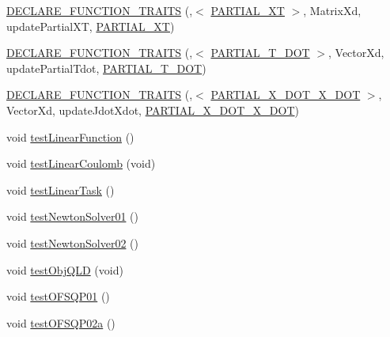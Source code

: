 \begin{DoxyCompactItemize}
\item 
\hyperlink{namespaceocra_a67f685d0a7fa29090f113f978c747179}{D\+E\+C\+L\+A\+R\+E\+\_\+\+F\+U\+N\+C\+T\+I\+O\+N\+\_\+\+T\+R\+A\+I\+TS} (,$<$ \hyperlink{namespaceocra_a40ddbec106a6034cd2047bba9945b568a66c63268a3ae1379cf55c6d7d14353de}{P\+A\+R\+T\+I\+A\+L\+\_\+\+XT} $>$, Matrix\+Xd, update\+Partial\+XT, \hyperlink{namespaceocra_a40ddbec106a6034cd2047bba9945b568a66c63268a3ae1379cf55c6d7d14353de}{P\+A\+R\+T\+I\+A\+L\+\_\+\+XT})
\item 
\hyperlink{namespaceocra_a14d77547fce68b12d71d570cc4e6740b}{D\+E\+C\+L\+A\+R\+E\+\_\+\+F\+U\+N\+C\+T\+I\+O\+N\+\_\+\+T\+R\+A\+I\+TS} (,$<$ \hyperlink{namespaceocra_a40ddbec106a6034cd2047bba9945b568a8636d1996b80fd5d53e2d2621dbf9ba6}{P\+A\+R\+T\+I\+A\+L\+\_\+\+T\+\_\+\+D\+OT} $>$, Vector\+Xd, update\+Partial\+Tdot, \hyperlink{namespaceocra_a40ddbec106a6034cd2047bba9945b568a8636d1996b80fd5d53e2d2621dbf9ba6}{P\+A\+R\+T\+I\+A\+L\+\_\+\+T\+\_\+\+D\+OT})
\item 
\hyperlink{namespaceocra_a4710be16a5cdd3678d4f26f155ce6774}{D\+E\+C\+L\+A\+R\+E\+\_\+\+F\+U\+N\+C\+T\+I\+O\+N\+\_\+\+T\+R\+A\+I\+TS} (,$<$ \hyperlink{namespaceocra_a40ddbec106a6034cd2047bba9945b568a3ba52241c6443b7205f52eb7c7e3e04c}{P\+A\+R\+T\+I\+A\+L\+\_\+\+X\+\_\+\+D\+O\+T\+\_\+\+X\+\_\+\+D\+OT} $>$, Vector\+Xd, update\+Jdot\+Xdot, \hyperlink{namespaceocra_a40ddbec106a6034cd2047bba9945b568a3ba52241c6443b7205f52eb7c7e3e04c}{P\+A\+R\+T\+I\+A\+L\+\_\+\+X\+\_\+\+D\+O\+T\+\_\+\+X\+\_\+\+D\+OT})
\item 
void \hyperlink{namespaceocra_a7341356a4b7a68447912171e62c727d3}{test\+Linear\+Function} ()
\item 
void \hyperlink{namespaceocra_a5973aff53b16d90407c82dcb6210c48e}{test\+Linear\+Coulomb} (void)
\item 
void \hyperlink{namespaceocra_ab690dbe78d926d15e444e73a6f67faf7}{test\+Linear\+Task} ()
\item 
void \hyperlink{namespaceocra_ae64acc62734a50a2f069755cca40191e}{test\+Newton\+Solver01} ()
\item 
void \hyperlink{namespaceocra_af7d2b78a380fe5aafe2b9a702e5a5347}{test\+Newton\+Solver02} ()
\item 
void \hyperlink{namespaceocra_a053cec45f4d336dc6425e24a2d8d4032}{test\+Obj\+Q\+LD} (void)
\item 
void \hyperlink{namespaceocra_ad44e7cce61ab6f95b66b751e6b223c9b}{test\+O\+F\+S\+Q\+P01} ()
\item 
void \hyperlink{namespaceocra_ac330f83952c8acdf4b4cb7dfcd513fc9}{test\+O\+F\+S\+Q\+P02a} ()

\end{DoxyCompactItemize}
